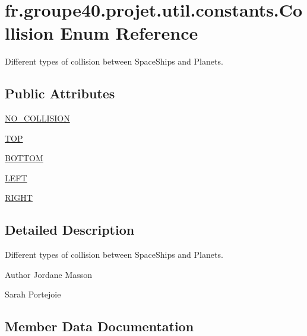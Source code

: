 \hypertarget{enumfr_1_1groupe40_1_1projet_1_1util_1_1constants_1_1_collision}{}\section{fr.\+groupe40.\+projet.\+util.\+constants.\+Collision Enum Reference}
\label{enumfr_1_1groupe40_1_1projet_1_1util_1_1constants_1_1_collision}


Different types of collision between Space\+Ships and Planets.  


\subsection*{Public Attributes}
\begin{DoxyCompactItemize}
\item 
\hyperlink{enumfr_1_1groupe40_1_1projet_1_1util_1_1constants_1_1_collision_a54505f17cfa9f2c6190bc0928502b33b}{N\+O\+\_\+\+C\+O\+L\+L\+I\+S\+I\+ON}
\item 
\hyperlink{enumfr_1_1groupe40_1_1projet_1_1util_1_1constants_1_1_collision_a33f93051e0cba60810a61290f849f5df}{T\+OP}
\item 
\hyperlink{enumfr_1_1groupe40_1_1projet_1_1util_1_1constants_1_1_collision_a40c6b56dc63c55c2eb0cd3489dc0fb46}{B\+O\+T\+T\+OM}
\item 
\hyperlink{enumfr_1_1groupe40_1_1projet_1_1util_1_1constants_1_1_collision_acd998526425d6791fc33670b48b56326}{L\+E\+FT}
\item 
\hyperlink{enumfr_1_1groupe40_1_1projet_1_1util_1_1constants_1_1_collision_a4dae805a2006ea468b9c2e0893a69ca3}{R\+I\+G\+HT}
\end{DoxyCompactItemize}


\subsection{Detailed Description}
Different types of collision between Space\+Ships and Planets. 

\begin{DoxyAuthor}{Author}
Jordane Masson 

Sarah Portejoie 
\end{DoxyAuthor}


\subsection{Member Data Documentation}
\mbox{\label{enumfr_1_1groupe40_1_1projet_1_1util_1_1constants_1_1_collision_a40c6b56dc63c55c2eb0cd3489dc0fb46}} 
